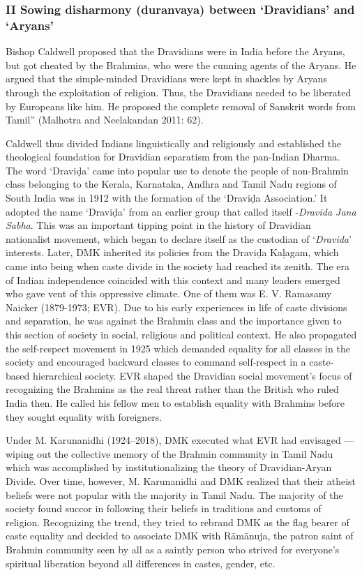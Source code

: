 \subsubsection*{II Sowing disharmony (duranvaya) between ‘Dravidians’ and ‘Aryans’ }

\begin{myquote}
Bishop Caldwell proposed that the Dravidians were in India before the Aryans, but got cheated by the Brahmins, who were the cunning agents of the Aryans. He argued that the simple-minded Dravidians were kept in shackles by Aryans through the exploitation of religion. Thus, the Dravidians needed to be liberated by Europeans like him. He proposed the complete removal of Sanskrit words from Tamil” (Malhotra and Neelakandan 2011: 62).
\end{myquote}

Caldwell thus divided Indians linguistically and religiously and established the theological foundation for Dravidian separatism from the pan-Indian Dharma. The word ‘Draviḍa’ came into popular use to denote the people of non-Brahmin class belonging to the Kerala, Karnataka, Andhra and Tamil Nadu regions of South India was in 1912 with the formation of the ‘Draviḍa Association.’ It adopted the name ‘Draviḍa’ from an earlier group that called itself -\textit{Dravida Jana Sabha}. This was an important tipping point in the history of Dravidian nationalist movement, which began to declare itself as the custodian of ‘\textit{Dravida}’ interests. Later, DMK inherited its policies from the Draviḍa Kaļagam, which came into being when caste divide in the society had reached its zenith. The era of Indian independence coincided with this context and many leaders emerged who gave vent of this oppressive climate. One of them was E. V. Ramasamy Naicker (1879-1973; EVR). Due to his early experiences in life of caste divisions and separation, he was against the Brahmin class and the importance given to this section of society in social, religious and political context. He also propagated the self-respect movement in 1925 which demanded equality for all classes in the society and encouraged backward classes to command self-respect in a caste-based hierarchical society. EVR shaped the Dravidian social movement’s focus of recognizing the Brahmins as the real threat rather than the British who ruled India then. He called his fellow men to establish equality with Brahmins before they sought equality with foreigners.

Under M. Karunanidhi (1924–2018), DMK executed what EVR had envisaged — wiping out the collective memory of the Brahmin community in Tamil Nadu which was accomplished by institutionalizing the theory of Dravidian-Aryan Divide. Over time, however, M. Karunanidhi and DMK realized that their atheist beliefs were not popular with the majority in Tamil Nadu. The majority of the society found succor in following their beliefs in traditions and customs of religion. Recognizing the trend, they tried to rebrand DMK as the flag bearer of caste equality and decided to associate DMK with Rāmānuja, the patron saint of Brahmin community seen by all as a saintly person who strived for everyone’s spiritual liberation beyond all differences in castes, gender, etc.


